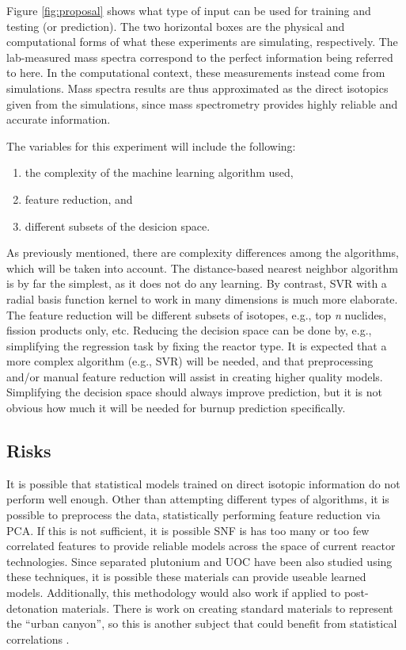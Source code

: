 Figure \ref{fig:proposal} shows what type of input can be used for training and
testing (or prediction). The two horizontal boxes are the physical and
computational forms of what these experiments are simulating, respectively. The
lab-measured mass spectra correspond to the perfect information being referred
to here. In the computational context, these measurements instead come from
simulations. Mass spectra results are thus approximated as the direct isotopics
given from the simulations, since mass spectrometry provides highly reliable
and accurate information.

The variables for this experiment will include the following:
\begin{enumerate}
  \itemsep-0.75em
  \item the complexity of the machine learning algorithm used, 
  \item feature reduction, and 
  \item different subsets of the desicion space. 
\end{enumerate}
As previously mentioned, there are complexity differences among the algorithms,
which will be taken into account.  The distance-based nearest neighbor
algorithm is by far the simplest, as it does not do any learning. By contrast,
\gls{SVR} with a radial basis function kernel to work in many dimensions is
much more elaborate.  The feature reduction will be different subsets of
isotopes, e.g., top \textit{n} nuclides, fission products only, etc.  Reducing
the decision space can be done by, e.g., simplifying the regression task by
fixing the reactor type. It is expected that a more complex algorithm (e.g.,
\gls{SVR}) will be needed, and that preprocessing and/or manual feature
reduction will assist in creating higher quality models.  Simplifying the
decision space should always improve prediction, but it is not obvious how much
it will be needed for burnup prediction specifically.

\subsection*{Risks}

It is possible that statistical models trained on direct isotopic information
do not perform well enough.  Other than attempting different types of
algorithms, it is possible to preprocess the data, statistically performing
feature reduction via \gls{PCA}. If this is not sufficient, it is possible
\gls{SNF} is has too many or too few correlated features to provide reliable
models across the space of current reactor technologies. Since separated
plutonium and \gls{UOC} have been also studied using these techniques, it is
possible these materials can provide useable learned models. Additionally, this
methodology would also work if applied to post-detonation materials. There is
work on creating standard materials to represent the ``urban canyon'', so this
is another subject that could benefit from statistical correlations
\cite{refmaterial}.

